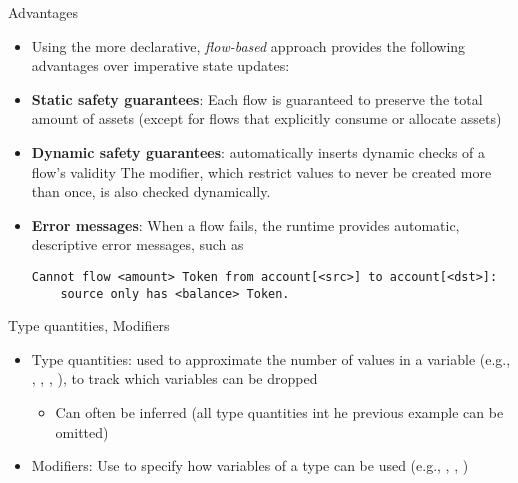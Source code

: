 \documentclass[leqno,presentation,usenames,dvipsnames]{beamer}
\begin{document}
\begin{frame}[fragile]{Advantages}
    \begin{itemize}
        \item Using the more declarative, \emph{flow-based} approach provides the following advantages over imperative state updates:
        \item \textbf{Static safety guarantees}: Each flow is guaranteed to preserve the total amount of assets (except for flows that explicitly consume or allocate assets)
        \item \textbf{Dynamic safety guarantees}: \langName automatically inserts dynamic checks of a flow's validity
            The  modifier, which restrict values to never be created more than once, is also checked dynamically.
        \item \textbf{Error messages}: When a flow fails, the \langName runtime provides automatic, descriptive error messages, such as
\begin{lstlisting}[numbers=none, basicstyle=\footnotesize\ttfamily, xleftmargin=-4.5em]
Cannot flow <amount> Token from account[<src>] to account[<dst>]:
    source only has <balance> Token.
\end{lstlisting}
    \end{itemize}
\end{frame}

\begin{frame}[fragile]{Type quantities, Modifiers}
    \begin{itemize}
        \item Type quantities: used to approximate the number of values in a variable (e.g., , , , ), to track which variables can be dropped
            \begin{itemize}
                \item Can often be inferred (all type quantities int he previous example can be omitted)
            \end{itemize}

        \item Modifiers: Use to specify how variables of a type can be used (e.g., , , )
    \end{itemize}

    
\end{frame}
\end{document}
